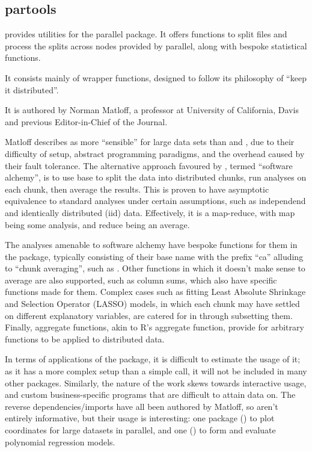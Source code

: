 \subsection{partools}\label{subsec:partools}

 provides utilities for the parallel
package\cite{matloff16softw_alchemy}.
It offers functions to split files and process the splits across nodes provided by parallel, along with bespoke statistical functions.

It consists mainly of wrapper functions, designed to follow its philosophy of ``keep it distributed''.

It is authored by Norman Matloff, a professor at University of California, Davis and previous Editor-in-Chief of the \R{} Journal.

Matloff describes  as more ``sensible'' for large data sets than  and , due to their difficulty of setup, abstract programming paradigms, and the overhead caused by their fault tolerance.
The alternative approach favoured by , termed ``software alchemy'', is to use base \R{} to split the data into distributed chunks, run analyses on each chunk, then average the results.
This is proven to have asymptotic equivalence to standard analyses under certain assumptions, such as independend and identically distributed (iid) data.
Effectively, it is a map-reduce, with map being some analysis, and reduce being an average.

The analyses amenable to software alchemy have bespoke functions for them in the package, typically consisting of their base \R{} name with the prefix ``ca'' alluding to ``chunk averaging'', such as .
Other functions in which it doesn't make sense to average are also supported, such as column sums, which also have specific functions made for them.
Complex cases such as fitting Least Absolute Shrinkage and Selection Operator (LASSO) models, in which each chunk may have settled on different explanatory variables, are catered for in  through subsetting them.
Finally, aggregate functions, akin to R's aggregate function, provide for arbitrary functions to be applied to distributed data.

In terms of applications of the package, it is difficult to estimate the usage of it; as it has a more complex setup than a simple  call, it will not be included in many other packages.
Similarly, the nature of the work skews towards interactive usage, and custom business-specific programs that are difficult to attain data on.
The reverse dependencies/imports have all been authored by Matloff, so aren't entirely informative, but their usage is interesting: one package () to plot coordinates for large datasets in parallel, and one () to form and evaluate polynomial regression models.

